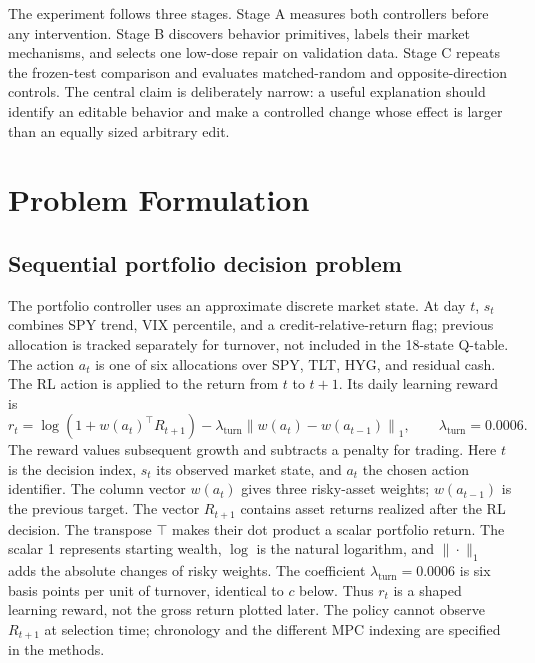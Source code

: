 \documentclass[11pt,a4paper]{article}
\begin{document}
The experiment follows three stages. Stage A measures both controllers before any intervention. Stage B discovers behavior primitives, labels their market mechanisms, and selects one low-dose repair on validation data. Stage C repeats the frozen-test comparison and evaluates matched-random and opposite-direction controls. The central claim is deliberately narrow: a useful explanation should identify an editable behavior and make a controlled change whose effect is larger than an equally sized arbitrary edit.

\section{Problem Formulation}
\subsection{Sequential portfolio decision problem}
The portfolio controller uses an approximate discrete market state. At day $t$, $s_t$ combines SPY trend, VIX percentile, and a credit-relative-return flag; previous allocation is tracked separately for turnover, not included in the 18-state Q-table. The action $a_t$ is one of six allocations over SPY, TLT, HYG, and residual cash. The RL action is applied to the return from $t$ to $t+1$. Its daily learning reward is
\begin{equation}
r_t = \log\!\left(1+w(a_t)^\top R_{t+1}\right) - \lambda_{\mathrm{turn}}\left\|w(a_t)-w(a_{t-1})\right\|_1,
\qquad \lambda_{\mathrm{turn}}=0.0006.
\label{eq:rl-reward}
\end{equation}
The reward values subsequent growth and subtracts a penalty for trading.
Here $t$ is the decision index, $s_t$ its observed market state, and $a_t$ the chosen action identifier. The column vector $w(a_t)$ gives three risky-asset weights; $w(a_{t-1})$ is the previous target. The vector $R_{t+1}$ contains asset returns realized after the RL decision. The transpose $\top$ makes their dot product a scalar portfolio return. The scalar 1 represents starting wealth, $\log$ is the natural logarithm, and $\|\cdot\|_1$ adds the absolute changes of risky weights. The coefficient $\lambda_{\mathrm{turn}}=0.0006$ is six basis points per unit of turnover, identical to $c$ below. Thus $r_t$ is a shaped learning reward, not the gross return plotted later. The policy cannot observe $R_{t+1}$ at selection time; chronology and the different MPC indexing are specified in the methods.
\end{document}
